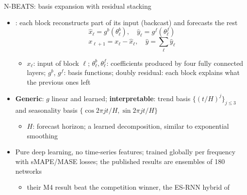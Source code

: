 \begin{frame}{N-BEATS: basis expansion with residual stacking}
\itemsize{\small}
\begin{itemize}
    \item {}: each block reconstructs part of its input (backcast) and forecasts the rest
    \[ \hat x_\ell = g^b(\theta^b_\ell), \quad \hat y_\ell = g^f(\theta^f_\ell) \]
    \[ x_{\ell+1} = x_\ell - \hat x_\ell, \quad \hat y = \sum_\ell\hat y_\ell \]
    \begin{itemize}
        \item $x_\ell$: input of block $\ell$; $\theta^b_\ell, \theta^f_\ell$: coefficients produced by four fully connected layers; $g^b$, $g^f$: basis functions; doubly residual: each block explains what the previous ones left
    \end{itemize}
    \item \textbf{Generic}: $g$ linear and learned; \textbf{interpretable}: trend basis $\{(t/H)^j\}_{j\le3}$ and seasonality basis $\{\cos 2\pi jt/H, \sin 2\pi jt/H\}$
    \begin{itemize}
        \item $H$: forecast horizon; a learned decomposition, similar to exponential smoothing
    \end{itemize}
    \item Pure deep learning, no time-series features; trained globally per frequency with sMAPE/MASE losses; the published results are ensembles of 180 networks
    \begin{itemize}
        \item their M4 result beat the competition winner, the ES-RNN hybrid of 
    \end{itemize}
\end{itemize}
\end{frame}

